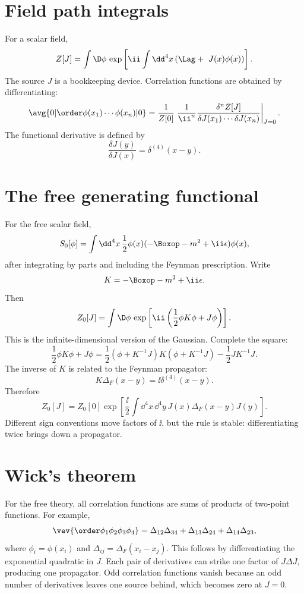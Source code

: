 \section{Field path integrals}

For a scalar field,
\[
  Z[J]=\int\D\phi\,
  \exp\left[
  \ii\int\dd^4x
  \left(
  \Lag+\ J(x)\phi(x)
  \right)
  \right].
\]
The source \(J\) is a bookkeeping device.  Correlation functions are obtained by differentiating:
\[
  \avg{0|\order\phi(x_1)\cdots\phi(x_n)|0}
  =
  \frac{1}{Z[0]}
  \left.
  \frac{1}{\ii^n}
  \frac{\delta^n Z[J]}
  {\delta J(x_1)\cdots\delta J(x_n)}
  \right|_{J=0}.
\]
The functional derivative is defined by
\[
  \frac{\delta J(y)}{\delta J(x)}=\delta^{(4)}(x-y).
\]

\section{The free generating functional}

For the free scalar field,
\[
  S_0[\phi]=
  \int\dd^4x\,\frac12\phi(x)(-\Boxop-m^2+\ii\epsilon)\phi(x),
\]
after integrating by parts and including the Feynman prescription.  Write
\[
  K=-\Boxop-m^2+\ii\epsilon.
\]
Then
\[
  Z_0[J]
  =
  \int\D\phi\,
  \exp\left[
  \ii\left(
  \frac12\phi K\phi+J\phi
  \right)
  \right].
\]
This is the infinite-dimensional version of the Gaussian.  Complete the square:
\[
  \frac12\phi K\phi+J\phi
  =
  \frac12(\phi+K^{-1}J)K(\phi+K^{-1}J)
  -\frac12J K^{-1}J.
\]
The inverse of \(K\) is related to the Feynman propagator:
\[
  K\Delta_F(x-y)=\ii\delta^{(4)}(x-y).
\]
Therefore
\[
  Z_0[J]=Z_0[0]\exp\left[
  \frac{\ii}{2}\int\dd^4x\,\dd^4y\,
  J(x)\Delta_F(x-y)J(y)
  \right].
\]
Different sign conventions move factors of \(\ii\), but the rule is stable: differentiating twice brings down a propagator.

\section{Wick's theorem}

For the free theory, all correlation functions are sums of products of two-point functions.  For example,
\[
  \vev{\order\phi_1\phi_2\phi_3\phi_4}
  =
  \Delta_{12}\Delta_{34}
  +\Delta_{13}\Delta_{24}
  +\Delta_{14}\Delta_{23},
\]
where \(\phi_i=\phi(x_i)\) and \(\Delta_{ij}=\Delta_F(x_i-x_j)\).  This follows by differentiating the exponential quadratic in \(J\).  Each pair of derivatives can strike one factor of \(J\Delta J\), producing one propagator.  Odd correlation functions vanish because an odd number of derivatives leaves one source behind, which becomes zero at \(J=0\).

